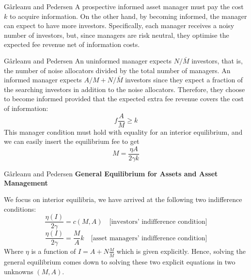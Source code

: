 \documentclass[aspectratio=169,xcolor=dvipsnames]{beamer}
\begin{document}
\begin{frame}{G\^arleanu and Pedersen}
    A prospective informed asset manager must pay the cost $k$ to acquire information. On the other hand, by becoming informed, the manager can expect to have more investors. Specifically, each manager receives a noisy number of investors, but, since managers are risk neutral, they optimise the expected fee revenue net of information costs.
\end{frame}

\begin{frame}{G\^arleanu and Pedersen}
    An uninformed manager expects $N/\bar M$ investors, that is, the number of noise allocators divided by the total number of managers. An informed manager expects $A/M + N/\bar M$ investors since they expect a fraction of the searching investors in addition to the noise allocators. Therefore, they choose to become informed provided that the expected extra fee revenue covers the cost of information:
    \[
        f \frac{A}{M} \ge k
    \]
    This manager condition must hold with equality for an interior equilibrium, and we can easily insert the equilibrium fee to get
    \[
        M = \frac{\eta A}{2 \gamma k}
    \]
\end{frame}

\begin{frame}{G\^arleanu and Pedersen}
    \textbf{General Equilibrium for Assets and Asset Management}

    We focus on interior equilibria, we have arrived at the following two indifference conditions:
    \[
        \frac{\eta(I)}{2 \gamma} = c(M, A) \quad \text{[investors' indifference condition]}
    \]
    \[
        \frac{\eta(I)}{2 \gamma} = \frac{M}{A} k \quad \text{[asset managers' indifference condition]}
    \]
    Where $\eta$ is a function of $I = A + N \frac{M}{\bar M}$ which is given explicitly. Hence, solving the general equilibrium comes down to solving these two explicit equations in two unknowns $(M, A)$.
\end{frame}
\end{document}
